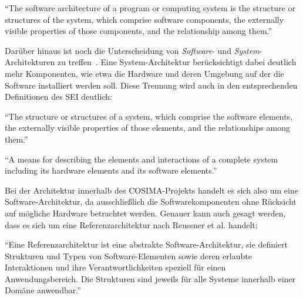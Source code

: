   \begin{definition}\label{def:architektur_bass_et_al}
    "`The software architecture of a program or computing system is the structure or structures of the system, which comprise software components, the externally visible properties of those components, and the relationship among them."'~\emph{\citep[S. 21]{software_architecture_in_practice}}
  \end{definition}
  
  Darüber hinaus ist noch die Unterscheidung von \emph{Software}- und \emph{System}-Architekturen zu treffen~\citep[S. xix]{evaluating_software_architectures}. Eine System-Architektur berücksichtigt dabei deutlich mehr Komponenten, wie etwa die Hardware und deren Umgebung auf der die Software installiert werden soll. Diese Trennung wird auch in den entsprechenden Definitionen des SEI deutlich:
  
  \begin{definition}\label{def:software_architektur_sei}
    "`The structure or structures of a system, which comprise the software elements, the externally visible properties of those elements, and the relationships among them."'~\emph{\citep{sei_glossary}}
  \end{definition}
  
  \begin{definition}\label{def:system_architektur}
    "`A means for describing the elements and interactions of a complete system including its hardware elements and its software elements."'~\emph{\citep{sei_glossary}}
  \end{definition}

  Bei der Architektur innerhalb des COSIMA-Projekts handelt es sich also um eine Software-Architektur, da ausschließlich die Softwarekomponenten ohne Rücksicht auf mögliche Hardware betrachtet werden. Genauer kann auch gesagt werden, dass es sich um eine Referenzarchitektur nach Reussner et al. handelt:
  
  \begin{definition}[Referenzarchitektur]\label{def:referenzarchitektur}
    "`Eine Referenzarchitektur ist eine abstrakte Software-Architektur, sie definiert Strukturen und Typen von Software-Elementen sowie deren erlaubte Interaktionen und ihre Verantwortlichkeiten speziell für einen Anwendungsbereich. Die Strukturen sind jeweils für alle Systeme innerhalb einer Domäne anwendbar."'~\emph{\citep[S. 358]{handbuch_der_software_architektur}}
  \end{definition}

